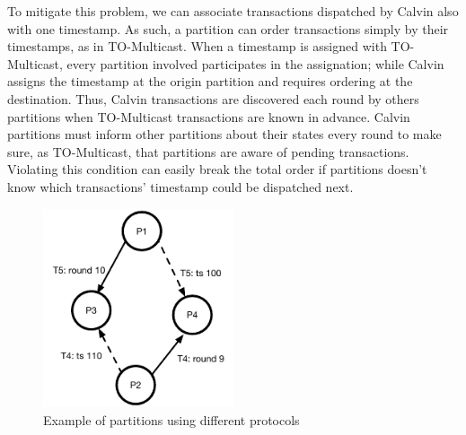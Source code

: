 \documentclass[a4paper, 10pt]{article}
\newcommand{\GE}{TO-Multicast}
\newcommand{\PE}{Calvin}
\newcommand{\Li}[1]{\mynote{Li}{#1}{blue}}
\newcommand{\Ch}[1]{\mynote{Ch}{#1}{green}}
\begin{document}
   To mitigate this problem, we can associate transactions dispatched by \PE{} also with one
   timestamp. As such, a partition can order transactions simply by their timestamps, as in {\GE}.
   When a timestamp is assigned with \GE{}, every partition involved participates in the
   assignation; while \PE{} assigns the timestamp at the origin partition and requires ordering at the destination.
   Thus, \PE{} transactions are discovered each round by others partitions when \GE{} transactions are known in advance.
   \PE{} partitions must inform other partitions about their states every round to make sure, as
   \GE, that partitions are aware of pending transactions. Violating this condition can easily break the
   total order if partitions doesn't know which transactions' timestamp could be dispatched next.




\begin{figure}
    \centering
    \includegraphics[width=0.5\textwidth]{assets/inconsistency}
    \caption{Example of partitions using different protocols}
    \label{fig:inconsistency}
\end{figure}
\end{document}
